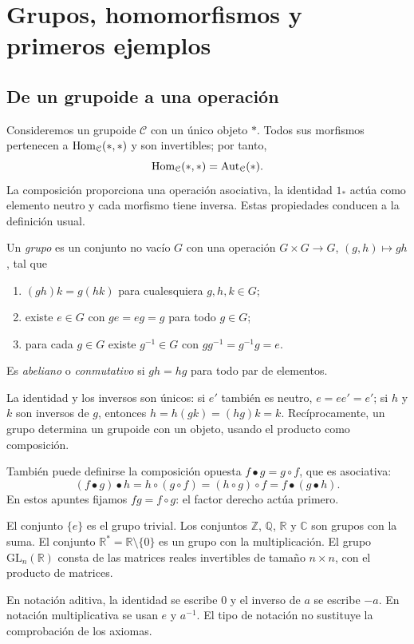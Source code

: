 \section{Grupos, homomorfismos y primeros ejemplos}\label{sec:grupos-fundamentos}

\subsection{De un grupoide a una operación}\label{tema:2-1-1}
Consideremos un grupoide $\mathcal C$ con un único objeto $*$. Todos sus morfismos pertenecen a $\operatorname{Hom}_{\mathcal C}(*,*)$ y son invertibles; por tanto,
\[
\operatorname{Hom}_{\mathcal C}(*,*)=\operatorname{Aut}_{\mathcal C}(*).
\]
La composición proporciona una operación asociativa, la identidad $1_*$ actúa como elemento neutro y cada morfismo tiene inversa. Estas propiedades conducen a la definición usual.

\begin{defi}
Un \emph{grupo} es un conjunto no vacío $G$ con una operación $G\times G\to G$, $(g,h)\mapsto gh$, tal que
\begin{enumerate}[label=\roman*)]
\item $(gh)k=g(hk)$ para cualesquiera $g,h,k\in G$;
\item existe $e\in G$ con $ge=eg=g$ para todo $g\in G$;
\item para cada $g\in G$ existe $g^{-1}\in G$ con $gg^{-1}=g^{-1}g=e$.
\end{enumerate}
Es \emph{abeliano} o \emph{conmutativo} si $gh=hg$ para todo par de elementos.
\end{defi}
La identidad y los inversos son únicos: si $e'$ también es neutro, $e=ee'=e'$; si $h$ y $k$ son inversos de $g$, entonces $h=h(gk)=(hg)k=k$. Recíprocamente, un grupo determina un grupoide con un objeto, usando el producto como composición.

\begin{obs}
También puede definirse la composición opuesta $f\mathbin{\bullet}g=g\circ f$, que es asociativa:
\[
(f\mathbin{\bullet}g)\mathbin{\bullet}h
=h\circ(g\circ f)=(h\circ g)\circ f
=f\mathbin{\bullet}(g\mathbin{\bullet}h).
\]
En estos apuntes fijamos $fg=f\circ g$: el factor derecho actúa primero.
\end{obs}

\begin{ejem}
El conjunto $\{e\}$ es el grupo trivial. Los conjuntos $\mathbb Z$, $\mathbb Q$, $\mathbb R$ y $\mathbb C$ son grupos con la suma. El conjunto $\mathbb R^*=\mathbb R\setminus\{0\}$ es un grupo con la multiplicación. El grupo $\mathrm{GL}_n(\mathbb R)$ consta de las matrices reales invertibles de tamaño $n\times n$, con el producto de matrices.
\end{ejem}
En notación aditiva, la identidad se escribe $0$ y el inverso de $a$ se escribe $-a$. En notación multiplicativa se usan $e$ y $a^{-1}$. El tipo de notación no sustituye la comprobación de los axiomas.

